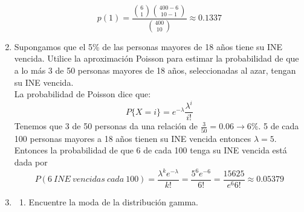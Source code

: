 \documentclass[11pt,a4paper]{report}
\begin{document}
\begin{enumerate}
{            $$p(1)=\frac{\binom{6}{1}\binom{400-6}{10-1}}{\binom{400}{10}}\approx 0.1337 $$
		}

		\item{
			Supongamos que el 5\% de las personas mayores de 18 años tiene su
            INE vencida. Utilice la aproximación Poisson para estimar la
            probabilidad de que a lo más 3 de 50 personas mayores de 18 años,
            seleccionadas al azar, tengan su INE vencida.\\
            La probabilidad de Poisson dice que:
            $$P\lbrace X=i \rbrace = e^{-\lambda} \frac{\lambda^{i}}{i!}$$
            Tenemos que 3 de 50 personas da una relación de $\frac{3}{50}=0.06 \rightarrow 6\%$. 5 de cada 100 personas mayores a 18 años tienen su INE vencida entonces $\lambda=5$. Entonces la probabilidad de que 6 de cada 100 tenga su INE vencida está dada por
            $$P(6 \ INE \ vencidas \ cada \ 100)=\frac{\lambda^{k}e^{-\lambda}}{k!}=\frac{5^{6}e^{-6}}{6!}=\frac{15625}{e^{6} 6!}\approx 0.05379$$
		}

		\item{
			\begin{enumerate}
				\item {
					Encuentre la moda de la distribución gamma.


}
\end{enumerate}}
\end{enumerate}
\end{document}
